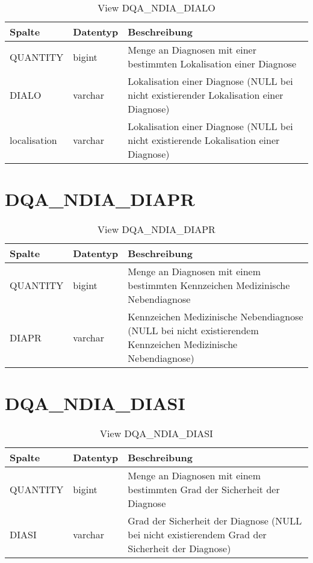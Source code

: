   \begin{table}[ht]
    \centering
    \caption{View DQA\_NDIA\_DIALO}
    \label{tab:dqandiadialo}
    \begin{tabular}{||l|l|p{10cm}||}
      \hline
      Spalte & Datentyp & Beschreibung \\ [0.5ex] \hline \hline
QUANTITY & bigint & Menge an Diagnosen mit einer bestimmten Lokalisation einer Diagnose \\ \hline
DIALO & varchar & Lokalisation einer Diagnose (NULL bei nicht existierender Lokalisation einer Diagnose)\\ \hline
localisation & varchar & Lokalisation einer Diagnose (NULL bei nicht existierende Lokalisation einer Diagnose)\\ \hline
    \end{tabular}
  \end{table}
 \clearpage
  \section{DQA\_NDIA\_DIAPR}

  \begin{table}[ht]
    \centering
    \caption{View DQA\_NDIA\_DIAPR}
    \label{tab:dqandiadiapr}
    \begin{tabular}{||l|l|p{10cm}||}
      \hline
      Spalte & Datentyp & Beschreibung \\ [0.5ex] \hline \hline
QUANTITY & bigint & Menge an Diagnosen mit einem bestimmten Kennzeichen Medizinische Nebendiagnose \\ \hline
DIAPR & varchar & Kennzeichen Medizinische Nebendiagnose (NULL bei nicht existierendem Kennzeichen Medizinische Nebendiagnose)\\ \hline
    \end{tabular}
  \end{table}

  \section{DQA\_NDIA\_DIASI}

  \begin{table}[ht]
    \centering
    \caption{View DQA\_NDIA\_DIASI}
    \label{tab:dqandiadiasi}
    \begin{tabular}{||l|l|p{10cm}||}
      \hline
      Spalte & Datentyp & Beschreibung \\ [0.5ex] \hline \hline
QUANTITY & bigint & Menge an Diagnosen mit einem bestimmten Grad der Sicherheit der Diagnose \\ \hline
DIASI & varchar & Grad der Sicherheit der Diagnose (NULL bei nicht existierendem Grad der Sicherheit der Diagnose)\\ \hline
    \end{tabular}
  \end{table}
 
